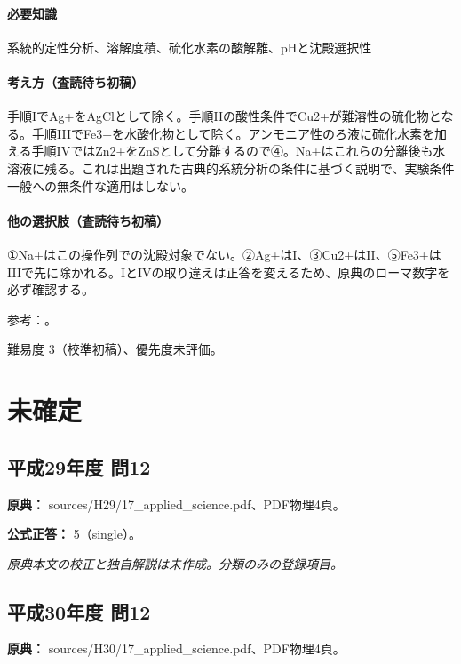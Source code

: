 \paragraph{必要知識} 系統的定性分析、溶解度積、硫化水素の酸解離、pHと沈殿選択性

\paragraph{考え方（査読待ち初稿）} 手順IでAg+をAgClとして除く。手順IIの酸性条件でCu2+が難溶性の硫化物となる。手順IIIでFe3+を水酸化物として除く。アンモニア性のろ液に硫化水素を加える手順IVではZn2+をZnSとして分離するので④。Na+はこれらの分離後も水溶液に残る。これは出題された古典的系統分析の条件に基づく説明で、実験条件一般への無条件な適用はしない。

\paragraph{他の選択肢（査読待ち初稿）} ①Na+はこの操作列での沈殿対象でない。②Ag+はI、③Cu2+はII、⑤Fe3+はIIIで先に除かれる。IとIVの取り違えは正答を変えるため、原典のローマ数字を必ず確認する。

\par 参考：\cite{qualitative_stanford}。

\par 難易度 3（校準初稿）、優先度未評価。

\section{未確定}

\subsection{平成29年度 問12}
\label{q:h29-reg-applied-12}

\noindent\textbf{原典：} sources/H29/17\_applied\_science.pdf、PDF物理4頁。

\textbf{公式正答：} 5（single）。

\par\textit{原典本文の校正と独自解説は未作成。分類のみの登録項目。}

\subsection{平成30年度 問12}
\label{q:h30-reg-applied-12}

\noindent\textbf{原典：} sources/H30/17\_applied\_science.pdf、PDF物理4頁。

